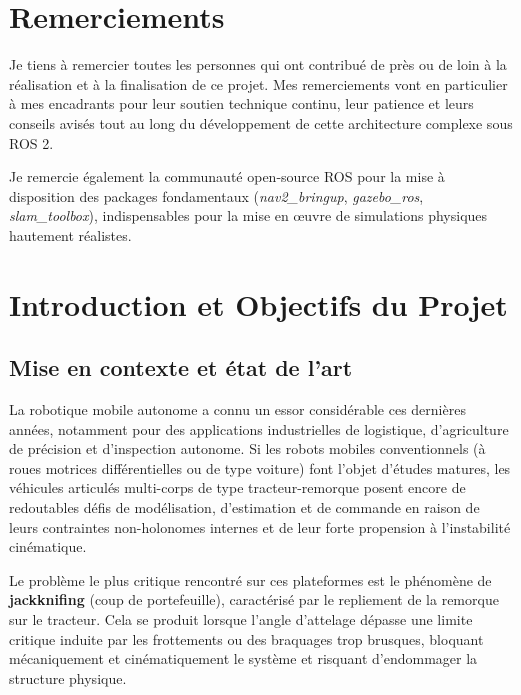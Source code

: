 \documentclass[12pt,a4paper,openany]{report}
\begin{document}
\chapter*{Remerciements}
Je tiens à remercier toutes les personnes qui ont contribué de près ou de loin à la réalisation et à la finalisation de ce projet. Mes remerciements vont en particulier à mes encadrants pour leur soutien technique continu, leur patience et leurs conseils avisés tout au long du développement de cette architecture complexe sous ROS 2. 

Je remercie également la communauté open-source ROS pour la mise à disposition des packages fondamentaux (\textit{nav2\_bringup}, \textit{gazebo\_ros}, \textit{slam\_toolbox}), indispensables pour la mise en œuvre de simulations physiques hautement réalistes.

\tableofcontents
\listoffigures
\listoftables

\chapter{Introduction et Objectifs du Projet}
\section{Mise en contexte et état de l'art}
La robotique mobile autonome a connu un essor considérable ces dernières années, notamment pour des applications industrielles de logistique, d'agriculture de précision et d'inspection autonome. Si les robots mobiles conventionnels (à roues motrices différentielles ou de type voiture) font l'objet d'études matures, les véhicules articulés multi-corps de type tracteur-remorque posent encore de redoutables défis de modélisation, d'estimation et de commande en raison de leurs contraintes non-holonomes internes et de leur forte propension à l'instabilité cinématique.

Le problème le plus critique rencontré sur ces plateformes est le phénomène de \textbf{jackknifing} (coup de portefeuille), caractérisé par le repliement de la remorque sur le tracteur. Cela se produit lorsque l'angle d'attelage dépasse une limite critique induite par les frottements ou des braquages trop brusques, bloquant mécaniquement et cinématiquement le système et risquant d'endommager la structure physique.
\end{document}
